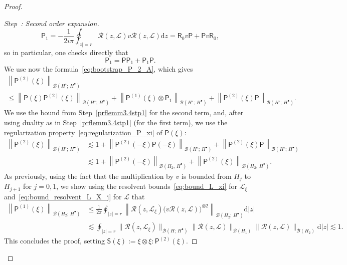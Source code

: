 \documentclass[10pt]{amsart}
\theoremstyle{definition}\newtheorem{defi}[theo]{Definition}\newtheorem{rema}[theo]{Remark}\newtheorem{exam}[theo]{Example}\newtheorem{exem}[theo]{Example}\newtheorem{nota}[theo]{Notation}
\renewcommand{\d}{\mathrm{d}}
\newcommand{\sfR}{\mathsf{R}}
\newcommand{\sfS}{\mathsf{S}}
\newcommand{\LL}{\mathcal{L}}
\newcommand{\PP}{\mathsf{P}}
\newcommand{\RR}{\mathcal{R}}
\newcommand{\BBB}{\mathscr{B}}
\newcommand{\Ss}{H}
\newcommand{\Ssp}{H^{\bullet}}
\newcommand{\Ssm}{H^{\circ}}
\renewcommand*\le{\leqslant}
\newcounter{stepcount}
\newenvironment{step}[1]{\refstepcounter{stepcount}\begin{proof}[Step~\thestepcount: #1]}{\let\qed\relax\end{proof}}
\begin{document}
\begin{proof}
\begin{step}{{Second order expansion}}
\begin{equation*}
\PP_{1} = - \frac{1}{2 i \pi} \oint_{|z| = r} \RR(z,\LL) v \RR(z,\LL) \d z = \sfR_{0} v \PP + \PP v \sfR_{0},
\end{equation*}
so in particular, one checks directly that
\[
\PP_{1} = \PP \PP_{1} + \PP_{1} \PP.
\]
We use now the formula~\eqref{eq:bootstrap_P_2_A}, which gives
\begin{multline*}
\left\| \PP^{(2)}(\xi) \right\|_{\BBB(\Ssm ;\,\Ssp)}  \\
\le \left\| \PP(\xi) \PP^{(2)}(\xi) \right\|_{\BBB(\Ssm ;\,\Ssp)} + \left\| \PP^{(1)}(\xi) \otimes \PP_{1} \right\|_{\BBB(\Ssm ;\,\Ssp)}
+ \left\| \PP^{(2)}(\xi) \PP \right\|_{\BBB(\Ssm;\,\Ssp)}.
\end{multline*}
We use the bound from Step~\ref{prflemm3.4stp1} for the second term, and, after using duality as in Step~\ref{prflemm3.4stp1} (for the first term), we use the regularization property~\eqref{eq:regularization_P_xi} of $\PP(\xi)$:
\begin{align*}
\left\| \PP^{(2)}(\xi) \right\|_{\BBB(\Ssm ;\,\Ssp)} & \lesssim 1 + \left\| \PP^{(2)}(-\xi) \PP(-\xi) \right\|_{\BBB(\Ssm ;\,\Ssp)} + \left\| \PP^{(2)}(\xi) \PP \right\|_{\BBB(\Ssm ;\,\Ssp)} \\
& \lesssim 1 + \left\| \PP^{(2)}(-\xi) \right\|_{\BBB(\Ss_{2},\,\Ssp)} + \left\| \PP^{(2)}(\xi) \right\|_{\BBB(\Ss_{2},\,\Ssp)}.
\end{align*}
As previously, using the fact that the multiplication by $v$ is bounded from $\Ss_{j}$ to $\Ss_{j+1}$ for $j=0,1$, we show using the resolvent bounds~\eqref{eq:bound_L_xi} for $\LL_\xi$ and~\eqref{eq:bound_resolvent_L_X_j} for $\LL$ that
\begin{align*}
\left\| \PP^{(1)}(\xi) \right\|_{\BBB(\Ss_{2} ;\,\Ssp)} & \le \frac{1}{2 \pi} \oint_{|z|=r} \left\| \RR(z,\LL_{\xi}) \Big(v \RR(z,\LL)\Big)^{\otimes 2} \right\|_{\BBB(\Ss_{2} ;\,\Ssp) } \d|z |\\
& \lesssim \oint_{|z|=r} \| \RR(z,\LL_{\xi}) \|_{\BBB(\Ss ;\,\Ssp) } \| \RR(z,\LL) \|_{\BBB(\Ss_{1})} \| \RR(z,\LL) \|_{\BBB(\Ss_{2})} \d| z|\lesssim 1.
\end{align*}
This concludes the proof, setting $\sfS(\xi) := \xi \otimes \xi : \PP^{(2)}(\xi)$.\qedhere
\end{step}\let\qed\relax
\end{proof}
\end{document}
